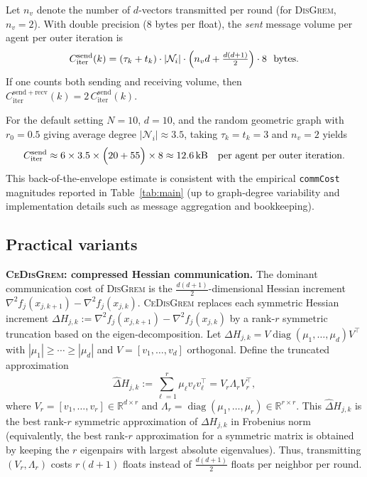 \documentclass[11pt,a4paper]{article}
\newcommand{\R}{\mathbb{R}}
\begin{document}
Let $n_v$ denote the number of $d$-vectors transmitted per round (for \textsc{DisGrem}, $n_v=2$).
With double precision (8 bytes per float), the \emph{sent} message volume per agent per outer iteration is
\begin{equation}\label{eq:comm_cost_iter}
	C_{\mathrm{iter}}^{\mathrm{send}}(k)
	= (\tau_k+t_k)\cdot |\mathcal N_i|\cdot \Bigl(n_v d + \tfrac{d(d+1)}{2}\Bigr)\cdot 8 \ \ \text{bytes}.
\end{equation}
If one counts both sending and receiving volume, then
$C_{\mathrm{iter}}^{\mathrm{send+recv}}(k)=2\,C_{\mathrm{iter}}^{\mathrm{send}}(k)$.

For the default setting $N=10$, $d=10$, and the random geometric graph with $r_0=0.5$ giving average degree
$|\mathcal N_i|\approx 3.5$, taking $\tau_k=t_k=3$ and $n_v=2$ yields
\[
C_{\mathrm{iter}}^{\mathrm{send}}\approx 6\times 3.5\times\Bigl(20+55\Bigr)\times 8
\approx 12.6\,\text{kB}
\quad \text{per agent per outer iteration}.
\]
This back-of-the-envelope estimate is consistent with the empirical \texttt{commCost} magnitudes reported in
Table~\ref{tab:main} (up to graph-degree variability and implementation details such as message aggregation and bookkeeping).
	
	\subsection{Practical variants}\label{ssec:variants}
	
\noindent\textbf{\textsc{CeDisGrem}: compressed Hessian communication.}
The dominant communication cost of \textsc{DisGrem} is the $\frac{d(d+1)}{2}$-dimensional
Hessian increment $\nabla^2 f_j(x_{j,k+1})-\nabla^2 f_j(x_{j,k})$.
\textsc{CeDisGrem} replaces each symmetric Hessian increment
$\Delta H_{j,k}:=\nabla^2 f_j(x_{j,k+1})-\nabla^2 f_j(x_{j,k})$
by a rank-$r$ symmetric truncation based on the eigen-decomposition.
Let $\Delta H_{j,k}=V\operatorname{diag}(\mu_1,\dots,\mu_d)V^\top$ with
$|\mu_1|\ge \cdots \ge |\mu_d|$ and $V=[v_1,\dots,v_d]$ orthogonal.
Define the truncated approximation
\[
\hat\Delta H_{j,k}:=\sum_{\ell=1}^r \mu_\ell v_\ell v_\ell^\top
= V_r\Lambda_r V_r^\top,
\]
where $V_r=[v_1,\dots,v_r]\in\R^{d\times r}$ and $\Lambda_r=\operatorname{diag}(\mu_1,\dots,\mu_r)\in\R^{r\times r}$.
This $\hat\Delta H_{j,k}$ is the best rank-$r$ symmetric approximation of $\Delta H_{j,k}$ in Frobenius norm
(equivalently, the best rank-$r$ approximation for a symmetric matrix is obtained by keeping the $r$
eigenpairs with largest absolute eigenvalues).
Thus, transmitting $(V_r,\Lambda_r)$ costs $r(d+1)$ floats instead of $\frac{d(d+1)}{2}$ floats per neighbor per round.
\end{document}
